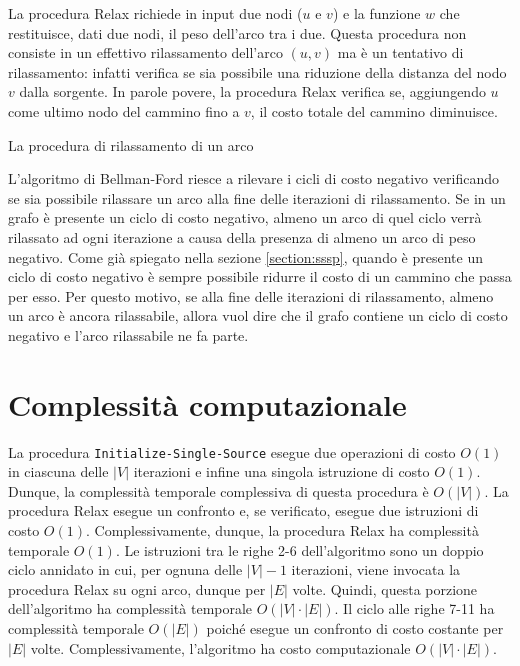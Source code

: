 \documentclass[12pt,a4paper,oneside]{book}
\begin{document}
	La procedura Relax richiede in input due nodi ($u$ e $v$) e la funzione $w$ che restituisce, dati due nodi, il peso dell'arco tra i due. Questa procedura non consiste in un effettivo rilassamento dell'arco $(u,v)$ ma è un tentativo di rilassamento: infatti verifica se sia possibile una riduzione della distanza del nodo $v$ dalla sorgente. In parole povere, la procedura Relax verifica se, aggiungendo $u$ come ultimo nodo del cammino fino a $v$, il costo totale del cammino diminuisce.
	
	\begin{algorithm}
		\caption{La procedura di rilassamento di un arco}
		\label{alg:relax}
	\end{algorithm}
	
	L'algoritmo di Bellman-Ford riesce a rilevare i cicli di costo negativo verificando se sia possibile rilassare un arco alla fine delle iterazioni di rilassamento. Se in un grafo è presente un ciclo di costo negativo, almeno un arco di quel ciclo verrà rilassato ad ogni iterazione a causa della presenza di almeno un arco di peso negativo. Come già spiegato nella sezione \ref{section:sssp}, quando è presente un ciclo di costo negativo è sempre possibile ridurre il costo di un cammino che passa per esso. Per questo motivo, se alla fine delle iterazioni di rilassamento, almeno un arco è ancora rilassabile, allora vuol dire che il grafo contiene un ciclo di costo negativo e l'arco rilassabile ne fa parte.

	\section{Complessità computazionale}
	La procedura \texttt{Initialize-Single-Source} esegue due operazioni di costo $O(1)$ in ciascuna delle $|V|$ iterazioni e infine una singola istruzione di costo $O(1)$. Dunque, la complessità temporale complessiva di questa procedura è $O(|V|)$. La procedura Relax esegue un confronto e, se verificato, esegue due istruzioni di costo $O(1)$. Complessivamente, dunque, la procedura Relax ha complessità temporale $O(1)$. Le istruzioni tra le righe 2-6 dell'algoritmo sono un doppio ciclo annidato in cui, per ognuna delle $|V|-1$ iterazioni, viene invocata la procedura Relax su ogni arco, dunque per $|E|$ volte. Quindi, questa porzione dell'algoritmo ha complessità temporale $O(|V|\cdot |E|)$. Il ciclo alle righe 7-11 ha complessità temporale $O(|E|)$ poiché esegue un confronto di costo costante per $|E|$ volte. Complessivamente, l'algoritmo ha costo computazionale $O(|V|\cdot |E|)$.
	
\end{document}
